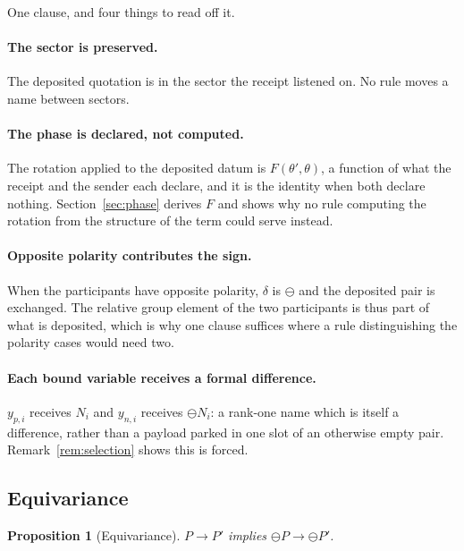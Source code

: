 \documentclass[11pt]{article}
\newtheorem{proposition}[theorem]{Proposition}
\theoremstyle{definition}
\theoremstyle{remark}
\newcommand{\negop}{\ensuremath{\ominus}}
\newcommand{\red}{\ensuremath{\rightarrow}}
\begin{document}
One clause, and four things to read off it.

\paragraph{The sector is preserved.}
The deposited quotation is in the sector the receipt listened on. No rule moves
a name between sectors.

\paragraph{The phase is declared, not computed.}
The rotation applied to the deposited datum is $F(\theta',\theta)$, a function
of what the receipt and the sender each declare, and it is the identity when
both declare nothing. Section~\ref{sec:phase} derives $F$ and shows why no rule
computing the rotation from the structure of the term could serve instead.

\paragraph{Opposite polarity contributes the sign.}
When the participants have opposite polarity, $\delta$ is $\negop$ and the
deposited pair is exchanged. The relative group element of the two participants
is thus part of what is deposited, which is why one clause suffices where a rule
distinguishing the polarity cases would need two.

\paragraph{Each bound variable receives a formal difference.}
$y_{p,i}$ receives $N_i$ and $y_{n,i}$ receives $\negop N_i$: a rank-one name
which is itself a difference, rather than a payload parked in one slot of an
otherwise empty pair. Remark~\ref{rem:selection} shows this is forced.

\subsection{Equivariance}

\begin{proposition}[Equivariance]
\label{prop:equivariance}
$P \red P'$ implies $\negop P \red \negop P'$.
\end{proposition}
\end{document}
